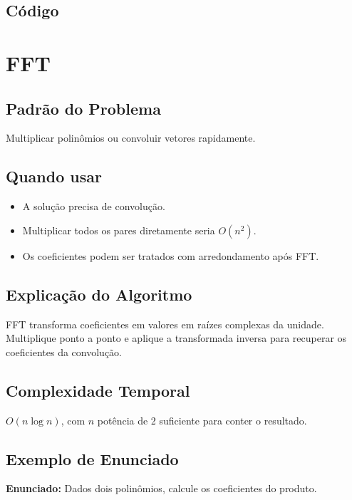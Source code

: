 \subsection{Código}

\section{FFT}

\subsection{Padrão do Problema}
Multiplicar polinômios ou convoluir vetores rapidamente.

\subsection{Quando usar}
\begin{itemize}[nosep]
  \item A solução precisa de convolução.
  \item Multiplicar todos os pares diretamente seria $O(n^2)$.
  \item Os coeficientes podem ser tratados com arredondamento após FFT.
\end{itemize}

\subsection{Explicação do Algoritmo}
FFT transforma coeficientes em valores em raízes complexas da unidade. Multiplique ponto a ponto e aplique a transformada inversa para recuperar os coeficientes da convolução.

\subsection{Complexidade Temporal}
$O(n \log n)$, com $n$ potência de 2 suficiente para conter o resultado.

\subsection{Exemplo de Enunciado}
\begin{exemplodiabox}
\textbf{Enunciado:} Dados dois polinômios, calcule os coeficientes do produto.
\end{exemplodiabox}

